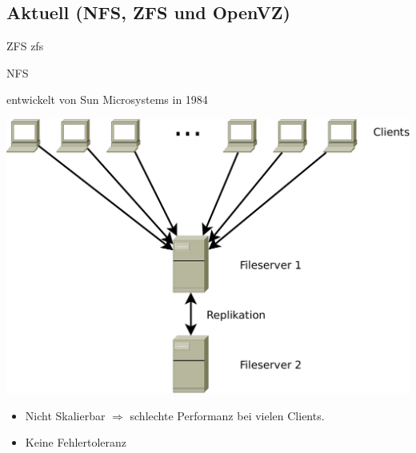 \documentclass[hyperref={xetex}]{beamer}
\begin{document}
\subsection{Aktuell  (NFS, ZFS und OpenVZ)}

\begin{frame}{ZFS}
   zfs 
\end{frame}
\begin{frame}{NFS}

		entwickelt von Sun Microsystems in 1984
		\begin{center}
			\includegraphics[scale=0.2]{images/nfs.pdf}
		\end{center}
		\begin{itemize}
			\item Nicht Skalierbar $\Rightarrow$ schlechte Performanz bei vielen Clients.
			\item Keine Fehlertoleranz
		\end{itemize}
\end{frame}
\end{document}
